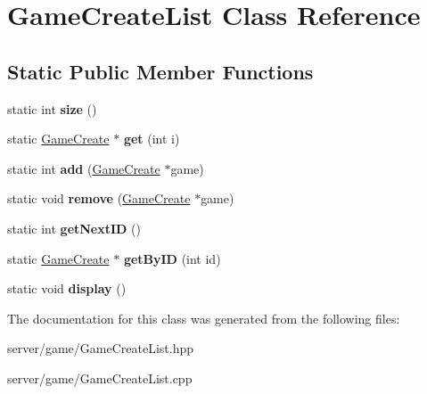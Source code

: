 \hypertarget{class_game_create_list}{\section{Game\-Create\-List Class Reference}
\label{class_game_create_list}
}
\subsection*{Static Public Member Functions}
\begin{DoxyCompactItemize}
\item 
\hypertarget{class_game_create_list_a81b11e599a99a97e9e8d3ace04876d4c}{static int {\bfseries size} ()}\label{class_game_create_list_a81b11e599a99a97e9e8d3ace04876d4c}

\item 
\hypertarget{class_game_create_list_a59d4040c3c1af43cede992b976a9f121}{static \hyperlink{class_game_create}{Game\-Create} $\ast$ {\bfseries get} (int i)}\label{class_game_create_list_a59d4040c3c1af43cede992b976a9f121}

\item 
\hypertarget{class_game_create_list_a74985486517404995378bf523ce147d0}{static int {\bfseries add} (\hyperlink{class_game_create}{Game\-Create} $\ast$game)}\label{class_game_create_list_a74985486517404995378bf523ce147d0}

\item 
\hypertarget{class_game_create_list_ac20c42e3053a4163d6dc5ccbdcd8decc}{static void {\bfseries remove} (\hyperlink{class_game_create}{Game\-Create} $\ast$game)}\label{class_game_create_list_ac20c42e3053a4163d6dc5ccbdcd8decc}

\item 
\hypertarget{class_game_create_list_a923be83b97592fb5d35666e44b7dd3a2}{static int {\bfseries get\-Next\-I\-D} ()}\label{class_game_create_list_a923be83b97592fb5d35666e44b7dd3a2}

\item 
\hypertarget{class_game_create_list_a4db1031a65288ca65c7b55f57f4fb9b6}{static \hyperlink{class_game_create}{Game\-Create} $\ast$ {\bfseries get\-By\-I\-D} (int id)}\label{class_game_create_list_a4db1031a65288ca65c7b55f57f4fb9b6}

\item 
\hypertarget{class_game_create_list_a3a61e87339a7e6208f62a89f4f3d851a}{static void {\bfseries display} ()}\label{class_game_create_list_a3a61e87339a7e6208f62a89f4f3d851a}

\end{DoxyCompactItemize}


The documentation for this class was generated from the following files\-:\begin{DoxyCompactItemize}
\item 
server/game/Game\-Create\-List.\-hpp\item 
server/game/Game\-Create\-List.\-cpp\end{DoxyCompactItemize}
